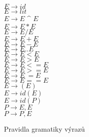 \begin{figure}
$ E \rightarrow id $ \\
$ E \rightarrow	lit $ \\
$ E \rightarrow E $ \^{ } $ E $ \\
$ E \rightarrow	E * E $ \\
$ E \rightarrow	E / E $ \\
$ E \rightarrow E + E $ \\
$ E \rightarrow	E - E $ \\
$ E \rightarrow	E .. E $ \\
$ E \rightarrow	E < E $ \\
$ E \rightarrow	E > E $ \\
$ E \rightarrow	E <= E $ \\
$ E \rightarrow	E >= E $ \\
$ E \rightarrow	E ~= E $ \\
$ E \rightarrow	E == E $ \\
$ E \rightarrow	( E ) $ \\
$ E \rightarrow	id ( E ) $ \\
$ E \rightarrow	id ( P ) $ \\
$ P \rightarrow E, E $ \\
$ P \rightarrow	P, E $ \\
\caption{Pravidla gramatiky výrazů}
\label{syn.expr}
\end{figure}

